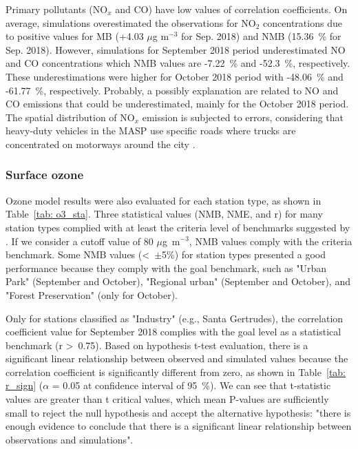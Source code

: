   Primary pollutants (NO$_x$ and CO) have low values of correlation coefficients.
  On average, simulations overestimated the observations for NO$_2$ concentrations due to positive values for MB (+4.03 $\mu$g m$^{-3}$ for Sep. 2018) and NMB (15.36~\% for Sep. 2018).
  However, simulations for September 2018 period underestimated NO and CO concentrations which NMB values are -7.22~\% and -52.3~\%, respectively.
  These underestimations were higher for October 2018 period with -48.06~\% and -61.77~\%, respectively.
  Probably, a possibly explanation are related to NO and CO emissions that could be underestimated, mainly for the October 2018 period.
  The spatial distribution of NO$_x$ emission is subjected to errors, considering that heavy-duty vehicles in the MASP use specific roads where trucks are concentrated on motorways around the city \citep{Ibarra2020}.
  
  
  
   \subsubsection{Surface ozone}
  Ozone model results were also evaluated for each station type, as shown in Table~\ref{tab: o3_sta}. 
  Three statistical values (NMB, NME, and r) for many station types complied with at least the criteria level of benchmarks suggested by \citet{Emery2017}.
  If we consider a cutoff value of 80 $\mu$g~m$^{-3}$, NMB values comply with the criteria benchmark. 
  Some NMB values (<~$\pm$5\%) for station types presented a good performance because they comply with the goal benchmark, such as "Urban Park" (September and October), "Regional urban" (September and October), and "Forest Preservation" (only for October).

  Only for stations classified as "Industry" (e.g., Santa Gertrudes), the correlation coefficient value for September 2018 complies with the goal level as a statistical benchmark (r >~0.75).
  Based on hypothesis t-test evaluation, there is a significant linear relationship between observed and simulated values because the correlation coefficient is significantly different from zero, as shown in Table~\ref{tab: r_sign} ($\alpha$ = 0.05 at confidence interval of 95~\%).
  We can see that t-statistic values are greater than t critical values, which mean P-values are sufficiently small to reject the null hypothesis and accept the alternative hypothesis: "there is enough evidence to conclude that there is a significant linear relationship between observations and simulations".
  
  
  
